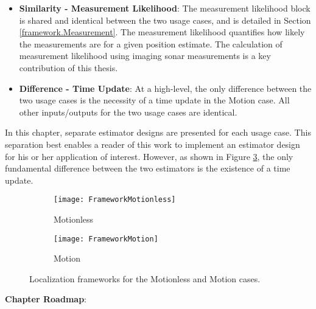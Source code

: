 \begin{itemize}
\item \textbf{Similarity - Measurement Likelihood}: The measurement likelihood block is shared and identical between the two usage cases, and is detailed in Section \ref{framework.Measurement}.
The measurement likelihood quantifies how likely the measurements are for a given position estimate.
The calculation of measurement likelihood using imaging sonar measurements is a key contribution of this thesis. 
\item \textbf{Difference - Time Update}: At a high-level, the only difference between the two usage cases is the necessity of a time update in the Motion case.
All other inputs/outputs for the two usage cases are identical.
\end{itemize}

\noindent In this chapter, separate estimator designs are presented for each usage case.
This separation best enables a reader of this work to implement an estimator design for his or her application of interest.
However, as shown in Figure \ref{fig:frameworks}, the only fundamental difference between the two estimators is the existence of a time update.

\begin{figure}[!h]
	\centering
	\begin{subfigure}[b]{0.4\textwidth}
                \texttt{[image: FrameworkMotionless]}
                \caption{Motionless}
                \label{fig:frameworkMotionless1}
  	\end{subfigure}
  	\hspace{4ex}
  	\centering
	\begin{subfigure}[b]{0.5\textwidth}
                \texttt{[image: FrameworkMotion]}
                \caption{Motion}
                \label{fig:frameworkMotion1}
  	\end{subfigure}
	\caption{Localization frameworks for the Motionless and Motion cases. }	
	\label{fig:frameworks}
\end{figure}

\noindent \textbf{Chapter Roadmap}:  

